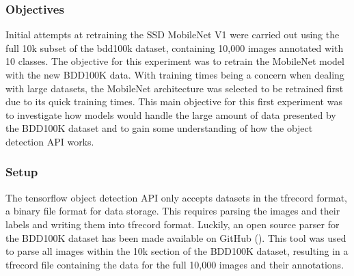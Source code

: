 \documentclass[12pt]{report}
\begin{document}
\subsubsection{Objectives}
\begin{flushleft}
Initial attempts at retraining the SSD MobileNet V1 were carried out using the full 10k subset of the bdd100k dataset, containing 10,000 images annotated with 10 classes. The objective for this experiment was to retrain the MobileNet model with the new BDD100K data. With training times being a concern when dealing with large datasets, the MobileNet architecture was selected to be retrained first due to its quick training times. This main objective for this first experiment was to investigate how models would handle the large amount of data presented by the BDD100K dataset and to gain some understanding of how the object detection API works. 
\end{flushleft}

\subsubsection{Setup}
\begin{flushleft}
The tensorflow object detection API only accepts datasets in the tfrecord format, a binary file format for data storage. This requires parsing the images and their labels and writing them into tfrecord format. Luckily, an open source parser for the BDD100K dataset has been made available on GitHub (\cite{parser}). This tool was used to parse all images within the 10k section of the BDD100K dataset, resulting in a tfrecord file containing the data for the full 10,000 images and their annotations.
\end{flushleft}
\end{document}
